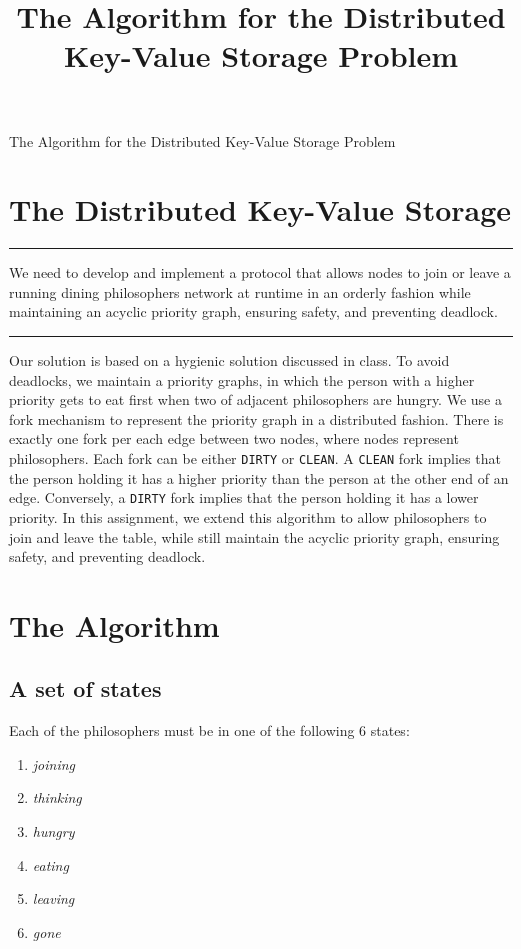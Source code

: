\documentclass[11pt]{article}
\title{The Algorithm for the Distributed Key-Value Storage Problem}
\newenvironment{problem}[1]{
\medskip \hrule \medskip
\noindent {\bf Problem #1.}
}{
\medskip \hrule \medskip
}
\begin{document}
\pagestyle{fancy}


\vspace*{0.1in}
\begin{center} \Large The Algorithm for the Distributed Key-Value Storage Problem \end{center}

\section{The Distributed Key-Value Storage}
\begin{problem}{Statement}
We need to develop and implement a protocol that allows nodes to join or leave a running dining philosophers network at runtime in an orderly fashion while maintaining an acyclic priority graph, ensuring safety, and preventing deadlock.
\end{problem}

Our solution is based on a hygienic solution discussed in class. To avoid deadlocks, we maintain a priority graphs, in which the person with a higher priority gets to eat first when two of adjacent philosophers are hungry. We use a fork mechanism to represent the priority graph in a distributed fashion. There is exactly one fork per each edge between two nodes, where nodes represent philosophers. Each fork can be either \texttt{DIRTY} or \texttt{CLEAN}. A \texttt{CLEAN} fork implies that the person holding it has a higher priority than the person at the other end of an edge. Conversely, a \texttt{DIRTY} fork implies that the person holding it has a lower priority. In this assignment, we extend this algorithm to allow philosophers to join and leave the table, while still maintain the acyclic priority graph, ensuring safety, and preventing deadlock.


\section{The Algorithm}
\subsection{A set of states}
Each of the philosophers must be in one of the following 6 states:
\begin{enumerate}
\item \textit{joining}
\item \textit{thinking}
\item \textit{hungry}
\item \textit{eating}
\item \textit{leaving}
\item \textit{gone}
\end{enumerate}
\end{document}
